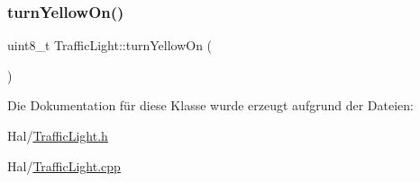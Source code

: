 \hypertarget{class_traffic_light_a74b400dafd029a2cfde6c27434111d21}{}\label{class_traffic_light_a74b400dafd029a2cfde6c27434111d21} 
\subsubsection{\texorpdfstring{turn\+Yellow\+On()}{turnYellowOn()}}
{\footnotesize\ttfamily uint8\+\_\+t Traffic\+Light\+::turn\+Yellow\+On (\begin{DoxyParamCaption}{ }\end{DoxyParamCaption})}



Die Dokumentation für diese Klasse wurde erzeugt aufgrund der Dateien\+:\begin{DoxyCompactItemize}
\item 
Hal/\hyperlink{_traffic_light_8h}{Traffic\+Light.\+h}\item 
Hal/\hyperlink{_traffic_light_8cpp}{Traffic\+Light.\+cpp}\end{DoxyCompactItemize}
